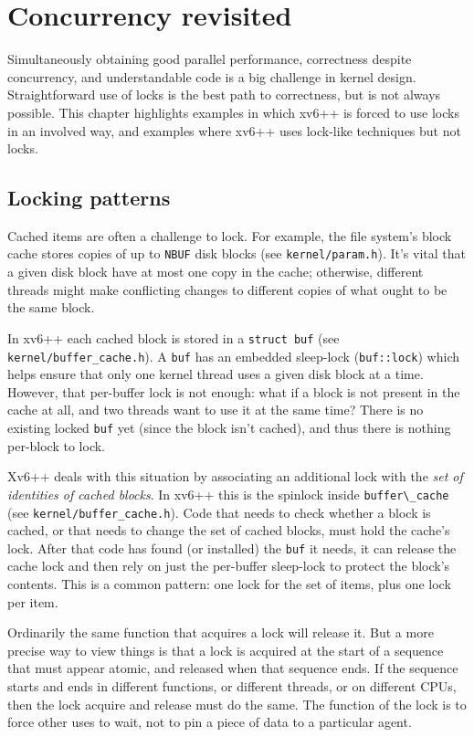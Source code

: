 \chapter{Concurrency revisited}
\label{CH:LOCK2}

Simultaneously obtaining good parallel performance, correctness despite
concurrency, and understandable code is a big challenge in kernel design.
Straightforward use of locks is the best path to correctness, but is not
always possible. This chapter highlights examples in which xv6++
is forced to use locks in an involved way, and examples where xv6++
uses lock-like techniques but not locks.

\section{Locking patterns}

Cached items are often a challenge to lock.
For example, the file system's block cache stores copies of up to
\lstinline{NBUF} disk blocks (see \texttt{kernel/param.h}).
It's vital that a given disk block have at most one copy in the cache;
otherwise, different threads might make conflicting changes to different
copies of what ought to be the same block.

In xv6++ each cached block is stored in a \lstinline{struct buf}
(see \texttt{kernel/buffer\_cache.h}).
A \lstinline{buf} has an embedded sleep-lock (\lstinline{buf::lock})
which helps ensure that only one kernel thread uses a given disk block at a time.
However, that per-buffer lock is not enough: what if a block is not present in
the cache at all, and two threads want to use it at the same time?
There is no existing locked \lstinline{buf} yet (since the block isn't cached),
and thus there is nothing per-block to lock.

Xv6++ deals with this situation by associating an additional lock with the
\emph{set of identities of cached blocks}. In xv6++ this is the
spinlock inside \lstinline{buffer\_cache} (see \texttt{kernel/buffer\_cache.h}).
Code that needs to check whether a block is cached, or that needs to change the
set of cached blocks, must hold the cache's lock. After that code has found (or
installed) the \lstinline{buf} it needs, it can release the cache lock and
then rely on just the per-buffer sleep-lock to protect the block's contents.
This is a common pattern: one lock for the set of items, plus one lock per item.

Ordinarily the same function that acquires a lock will release it.
But a more precise way to view things is that a lock is acquired at the start of
a sequence that must appear atomic, and released when that sequence ends.
If the sequence starts and ends in different functions, or different threads,
or on different CPUs, then the lock acquire and release must do the same.
The function of the lock is to force other uses to wait, not to pin a piece of
data to a particular agent.

